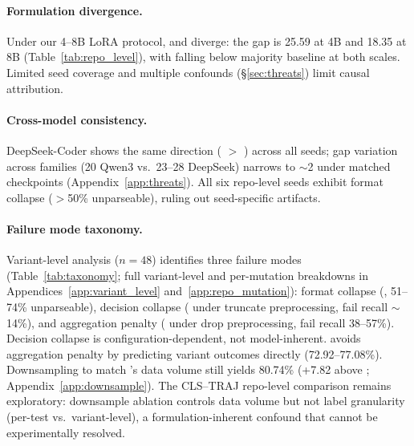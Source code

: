 \paragraph{Formulation divergence.} Under our 4--8B LoRA protocol, \cls{} and \cwm{} diverge: the gap is 25.59\pp{} at 4B and 18.35\pp{} at 8B (Table~\ref{tab:repo_level}), with \cwm{} falling below majority baseline at both scales. Limited seed coverage and multiple confounds (\S\ref{sec:threats}) limit causal attribution.

\paragraph{Cross-model consistency.} DeepSeek-Coder shows the same direction (\cls{} $>$ \cwm{}) across all seeds; gap variation across families (20\pp{} Qwen3 vs.\ 23--28\pp{} DeepSeek) narrows to ${\sim}$2\pp{} under matched checkpoints (Appendix~\ref{app:threats}). All six \cwm{} repo-level seeds exhibit format collapse ($>$50\% unparseable), ruling out seed-specific artifacts.

\paragraph{Failure mode taxonomy.} Variant-level analysis ($n{=}48$) identifies three failure modes (Table~\ref{tab:taxonomy}; full variant-level and per-mutation breakdowns in Appendices~\ref{app:variant_level} and~\ref{app:repo_mutation}): format collapse (\cwm{}, 51--74\% unparseable), decision collapse (\cls{} under truncate preprocessing, fail recall ${\sim}$14\%), and aggregation penalty (\cls{} under drop preprocessing, fail recall 38--57\%). Decision collapse is configuration-dependent, not model-inherent. \traj{} avoids aggregation penalty by predicting variant outcomes directly (72.92--77.08\%). Downsampling \cls{} to match \traj{}'s data volume still yields 80.74\% (+7.82\pp{} above \traj{}; Appendix~\ref{app:downsample}). The CLS--TRAJ repo-level comparison remains exploratory: downsample ablation controls data volume but not label granularity (per-test vs.\ variant-level), a formulation-inherent confound that cannot be experimentally resolved.

\begin{table}[t]
\centering
\small
\caption{Repo-level failure mode taxonomy. Variant-level majority baseline: 54.17\%.}
\label{tab:taxonomy}
\setlength{\tabcolsep}{3pt}
\end{table}

